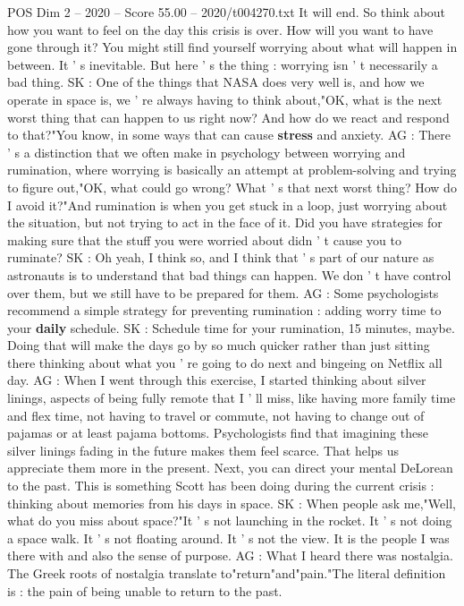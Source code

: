 \begin{textsample}{POS Dim 2 – 2020 – Score 55.00 – 2020/t004270.txt}
It will end.
So think about how you want to feel on the day this crisis is over.
How will you want to have gone through it?
You might still find yourself worrying about what will happen in between.
It ' s inevitable.
But here ' s the thing : worrying isn ' t necessarily a bad thing.
SK : One of the things that NASA does very well is, and how we operate in space is, we ' re always having to think about,"OK, what is the next worst thing that can happen to us right now?
And how do we react and respond to that?"You know, in some ways that can cause \textbf{stress} and anxiety.
AG : There ' s a distinction that we often make in psychology between worrying and rumination, where worrying is basically an attempt at problem-solving and trying to figure out,"OK, what could go wrong?
What ' s that next worst thing?
How do I avoid it?"And rumination is when you get stuck in a loop, just worrying about the situation, but not trying to act in the face of it.
Did you have strategies for making sure that the stuff you were worried about didn ' t cause you to ruminate?
SK : Oh yeah, I think so, and I think that ' s part of our nature as astronauts is to understand that bad things can happen.
We don ' t have control over them, but we still have to be prepared for them.
AG : Some psychologists recommend a simple strategy for preventing rumination : adding worry time to your \textbf{daily} schedule.
SK : Schedule time for your rumination, 15 minutes, maybe.
Doing that will make the days go by so much quicker rather than just sitting there thinking about what you ' re going to do next and bingeing on Netflix all day.
AG : When I went through this exercise, I started thinking about silver linings, aspects of being fully remote that I ' ll miss, like having more family time and flex time, not having to travel or commute, not having to change out of pajamas or at least pajama bottoms.
Psychologists find that imagining these silver linings fading in the future makes them feel scarce.
That helps us appreciate them more in the present.
Next, you can direct your mental DeLorean to the past.
This is something Scott has been doing during the current crisis : thinking about memories from his days in space.
SK : When people ask me,"Well, what do you miss about space?"It ' s not launching in the rocket.
It ' s not doing a space walk.
It ' s not floating around.
It ' s not the view.
It is the people I was there with and also the sense of purpose.
AG : What I heard there was nostalgia.
The Greek roots of nostalgia translate to"return"and"pain."The literal definition is : the pain of being unable to return to the past.

\end{textsample}

